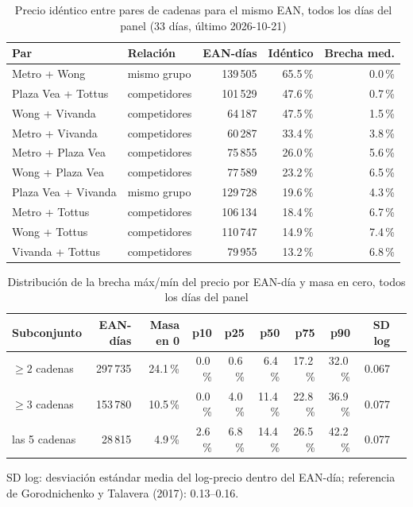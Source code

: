 
\begin{table}[htbp]
\caption{Precio id\'entico entre pares de cadenas para el mismo EAN, todos los d\'ias del panel (33 d\'ias, \'ultimo 2026-10-21)}
\label{tab:identidad}
\centering\scriptsize\setlength{\tabcolsep}{3pt}
\begin{tabular}{@{}llrrr@{}}
\toprule
Par & Relaci\'on & EAN-d\'ias & Id\'entico & Brecha med. \\
\midrule
Metro + Wong & mismo grupo & 139\,505 & 65.5\,\% & 0.0\,\% \\
Plaza Vea + Tottus & competidores & 101\,529 & 47.6\,\% & 0.7\,\% \\
Wong + Vivanda & competidores & 64\,187 & 47.5\,\% & 1.5\,\% \\
Metro + Vivanda & competidores & 60\,287 & 33.4\,\% & 3.8\,\% \\
Metro + Plaza Vea & competidores & 75\,855 & 26.0\,\% & 5.6\,\% \\
Wong + Plaza Vea & competidores & 77\,589 & 23.2\,\% & 6.5\,\% \\
Plaza Vea + Vivanda & mismo grupo & 129\,728 & 19.6\,\% & 4.3\,\% \\
Metro + Tottus & competidores & 106\,134 & 18.4\,\% & 6.7\,\% \\
Wong + Tottus & competidores & 110\,747 & 14.9\,\% & 7.4\,\% \\
Vivanda + Tottus & competidores & 79\,955 & 13.2\,\% & 6.8\,\% \\
\bottomrule\end{tabular}\end{table}

\begin{table}[t]
\caption{Distribuci\'on de la brecha m\'ax/m\'in del precio por EAN-d\'ia y masa en cero, todos los d\'ias del panel}
\label{tab:brecha}
\centering\scriptsize\setlength{\tabcolsep}{4pt}
\begin{tabular}{@{}lrrrrrrrrr@{}}
\toprule
Subconjunto & EAN-d\'ias & Masa en 0 & p10 & p25 & p50 & p75 & p90 & SD log \\
\midrule
$\geq 2$ cadenas & 297\,735 & 24.1\,\% & 0.0\,\% & 0.6\,\% & 6.4\,\% & 17.2\,\% & 32.0\,\% & 0.067 \\
$\geq 3$ cadenas & 153\,780 & 10.5\,\% & 0.0\,\% & 4.0\,\% & 11.4\,\% & 22.8\,\% & 36.9\,\% & 0.077 \\
las 5 cadenas & 28\,815 & 4.9\,\% & 2.6\,\% & 6.8\,\% & 14.4\,\% & 26.5\,\% & 42.2\,\% & 0.077 \\
\bottomrule\end{tabular}
\par\smallskip\raggedright\scriptsize SD log: desviaci\'on est\'andar media del log-precio dentro del EAN-d\'ia; referencia de Gorodnichenko y Talavera (2017): 0.13--0.16.
\end{table}

